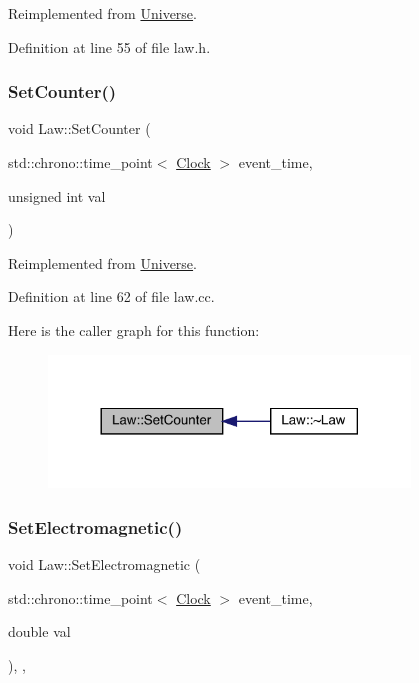 Reimplemented from \hyperlink{class_universe_a3b3da7c86a7b75e5e5c0b7972ac82a87}{Universe}.



Definition at line 55 of file law.\+h.

\mbox{\label{class_law_a408c401c8a44870c29ba9d08b45cb40f}} 
\subsubsection{\texorpdfstring{Set\+Counter()}{SetCounter()}}
{\footnotesize\ttfamily void Law\+::\+Set\+Counter (\begin{DoxyParamCaption}\item[{std\+::chrono\+::time\+\_\+point$<$ \hyperlink{universe_8h_a0ef8d951d1ca5ab3cfaf7ab4c7a6fd80}{Clock} $>$}]{event\+\_\+time,  }\item[{unsigned int}]{val }\end{DoxyParamCaption})\hspace{0.3cm}{\ttfamily [virtual]}}



Reimplemented from \hyperlink{class_universe_aa22202ae740eb1355529afcb13285e91}{Universe}.



Definition at line 62 of file law.\+cc.

Here is the caller graph for this function\+:
\nopagebreak
\begin{figure}[H]
\begin{center}
\leavevmode
\includegraphics[width=272pt]{class_law_a408c401c8a44870c29ba9d08b45cb40f_icgraph}
\end{center}
\end{figure}
\mbox{\label{class_law_acabe1a3113c207368f3bb6fe81e13963}} 
\subsubsection{\texorpdfstring{Set\+Electromagnetic()}{SetElectromagnetic()}}
{\footnotesize\ttfamily void Law\+::\+Set\+Electromagnetic (\begin{DoxyParamCaption}\item[{std\+::chrono\+::time\+\_\+point$<$ \hyperlink{universe_8h_a0ef8d951d1ca5ab3cfaf7ab4c7a6fd80}{Clock} $>$}]{event\+\_\+time,  }\item[{double}]{val }\end{DoxyParamCaption})\hspace{0.3cm}{\ttfamily [inline]}, {\ttfamily [final]}, {\ttfamily [virtual]}}



